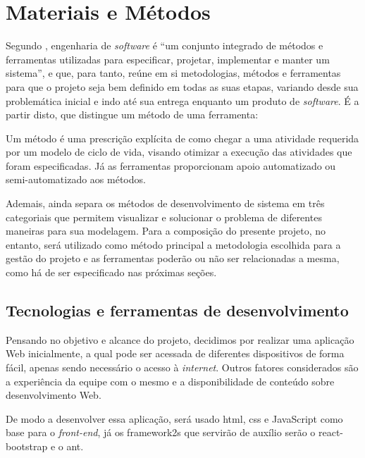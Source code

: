 \chapter{Materiais e Métodos}
Segundo , engenharia de \textsl{software} é ``um conjunto integrado de métodos e ferramentas utilizadas para especificar, projetar, implementar e manter um sistema'', e que, para tanto, reúne em si metodologias, métodos e ferramentas para que o projeto seja bem definido em todas as suas etapas, variando desde sua problemática inicial e indo até sua entrega enquanto um produto de \textsl{software}. É a partir disto, que  distingue um método de uma ferramenta:

\begin{citacao}

Um método é uma prescrição explícita de como chegar a uma atividade requerida por um modelo de ciclo de vida, visando otimizar a execução das atividades que foram especificadas. Já as ferramentas proporcionam apoio automatizado ou semi-automatizado aos métodos\cite{Junior:2010}.

\end{citacao}

Ademais,  ainda separa os métodos de desenvolvimento de sistema em três categoriais que permitem visualizar e solucionar o problema de diferentes maneiras para sua modelagem. Para a composição do presente projeto, no entanto, será utilizado como método principal a metodologia escolhida para a gestão do projeto e as ferramentas poderão ou não ser relacionadas a mesma, como há de ser especificado nas próximas seções.
\section{Tecnologias e ferramentas de desenvolvimento}

Pensando no objetivo e alcance do projeto, decidimos por realizar uma aplicação Web inicialmente, a qual pode ser acessada de diferentes dispositivos de forma fácil, apenas sendo necessário o acesso à \textit{internet}. Outros fatores considerados são a experiência da equipe com o mesmo e a disponibilidade de conteúdo sobre desenvolvimento Web.

De modo a desenvolver essa aplicação, será usado \acs{html}, \acs{css} e JavaScript como base para o \textsl{\gls{front-end}}, já os \glspl{framework2} que servirão de auxílio serão o \gls{react-bootstrap} e o \gls{ant}. 


